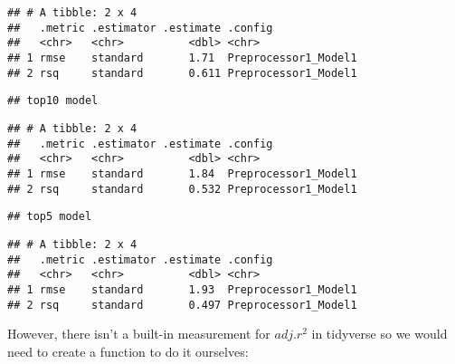 \documentclass[
]{article}
\begin{document}
\begin{verbatim}
## # A tibble: 2 x 4
##   .metric .estimator .estimate .config             
##   <chr>   <chr>          <dbl> <chr>               
## 1 rmse    standard       1.71  Preprocessor1_Model1
## 2 rsq     standard       0.611 Preprocessor1_Model1
\end{verbatim}

\begin{verbatim}
## top10 model
\end{verbatim}

\begin{verbatim}
## # A tibble: 2 x 4
##   .metric .estimator .estimate .config             
##   <chr>   <chr>          <dbl> <chr>               
## 1 rmse    standard       1.84  Preprocessor1_Model1
## 2 rsq     standard       0.532 Preprocessor1_Model1
\end{verbatim}

\begin{verbatim}
## top5 model
\end{verbatim}

\begin{verbatim}
## # A tibble: 2 x 4
##   .metric .estimator .estimate .config             
##   <chr>   <chr>          <dbl> <chr>               
## 1 rmse    standard       1.93  Preprocessor1_Model1
## 2 rsq     standard       0.497 Preprocessor1_Model1
\end{verbatim}

However, there isn't a built-in measurement for \(adj. r^2\) in
tidyverse so we would need to create a function to do it ourselves:
\end{document}
